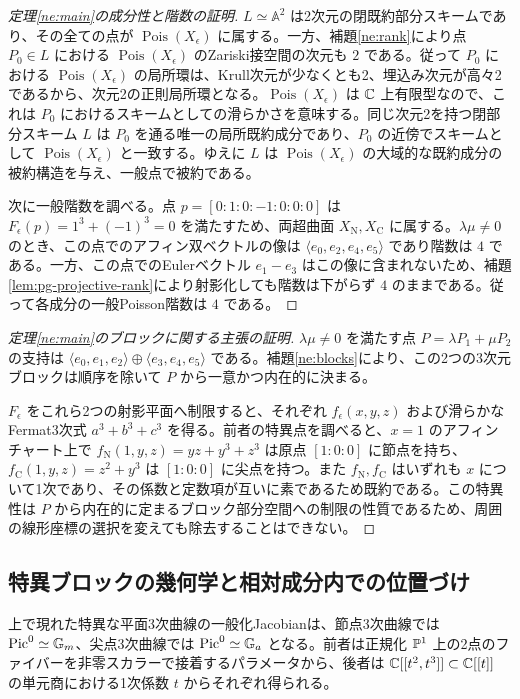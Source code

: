 \begin{proof}[定理\ref{ne:main}の成分性と階数の証明]
$L\simeq\mathbb A^2$ は2次元の閉既約部分スキームであり、その全ての点が $\operatorname{Pois}(X_\epsilon)$ に属する。一方、補題\ref{ne:rank}により点 $P_0\in L$ における $\operatorname{Pois}(X_\epsilon)$ のZariski接空間の次元も $2$ である。従って $P_0$ における $\operatorname{Pois}(X_\epsilon)$ の局所環は、Krull次元が少なくとも2、埋込み次元が高々2であるから、次元2の正則局所環となる。$\operatorname{Pois}(X_\epsilon)$ は $\mathbb C$ 上有限型なので、これは $P_0$ におけるスキームとしての滑らかさを意味する。同じ次元2を持つ閉部分スキーム $L$ は $P_0$ を通る唯一の局所既約成分であり、$P_0$ の近傍でスキームとして $\operatorname{Pois}(X_\epsilon)$ と一致する。ゆえに $L$ は $\operatorname{Pois}(X_\epsilon)$ の大域的な既約成分の被約構造を与え、一般点で被約である。

次に一般階数を調べる。点 $p=[0:1:0:-1:0:0:0]$ は $F_\epsilon(p)=1^3+(-1)^3=0$ を満たすため、両超曲面 $X_{\mathrm N},X_{\mathrm C}$ に属する。$\lambda\mu\ne0$ のとき、この点でのアフィン双ベクトルの像は $\langle e_0,e_2,e_4,e_5\rangle$ であり階数は $4$ である。一方、この点でのEulerベクトル $e_1-e_3$ はこの像に含まれないため、補題\ref{lem:pg-projective-rank}により射影化しても階数は下がらず $4$ のままである。従って各成分の一般Poisson階数は $4$ である。
\end{proof}

\begin{proof}[定理\ref{ne:main}のブロックに関する主張の証明]
$\lambda\mu\ne0$ を満たす点 $P=\lambda P_1+\mu P_2$ の支持は $\langle e_0,e_1,e_2\rangle\oplus\langle e_3,e_4,e_5\rangle$ である。補題\ref{ne:blocks}により、この2つの3次元ブロックは順序を除いて $P$ から一意かつ内在的に決まる。

$F_\epsilon$ をこれら2つの射影平面へ制限すると、それぞれ $f_\epsilon(x,y,z)$ および滑らかなFermat3次式 $a^3+b^3+c^3$ を得る。前者の特異点を調べると、$x=1$ のアフィンチャート上で $f_{\mathrm N}(1,y,z)=yz+y^3+z^3$ は原点 $[1:0:0]$ に節点を持ち、$f_{\mathrm C}(1,y,z)=z^2+y^3$ は $[1:0:0]$ に尖点を持つ。また $f_{\mathrm N},f_{\mathrm C}$ はいずれも $x$ について1次であり、その係数と定数項が互いに素であるため既約である。この特異性は $P$ から内在的に定まるブロック部分空間への制限の性質であるため、周囲の線形座標の選択を変えても除去することはできない。
\end{proof}

\subsection{特異ブロックの幾何学と相対成分内での位置づけ}
上で現れた特異な平面3次曲線の一般化Jacobianは、節点3次曲線では $\operatorname{Pic}^0\simeq\mathbb G_m$、尖点3次曲線では $\operatorname{Pic}^0\simeq\mathbb G_a$ となる。前者は正規化 $\mathbb P^1$ 上の2点のファイバーを非零スカラーで接着するパラメータから、後者は $\mathbb C[[t^2,t^3]]\subset\mathbb C[[t]]$ の単元商における1次係数 $t$ からそれぞれ得られる。

